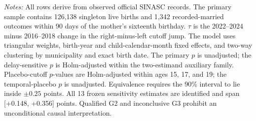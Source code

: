 \begin{table}[!htbp]
\begin{minipage}{0.98\linewidth}
\emph{Notes:} All rows derive from observed official SINASC records. The primary sample contains 126,138 singleton live births and 1,342 recorded-married outcomes within 90 days of the mother's sixteenth birthday. $\tau$ is the 2022--2024 minus 2016--2018 change in the right-minus-left cutoff jump. The model uses triangular weights, birth-year and child-calendar-month fixed effects, and two-way clustering by municipality and exact birth date. The primary $p$ is unadjusted; the delay-sensitive $p$ is Holm-adjusted within the two-estimand auxiliary family. Placebo-cutoff $p$-values are Holm-adjusted within ages 15, 17, and 19; the temporal-placebo $p$ is unadjusted. Equivalence requires the 90\% interval to lie inside $\pm0.25$ points. All 13 frozen sensitivity estimates are identified and span [+0.148, +0.356] points. Qualified G2 and inconclusive G3 prohibit an unconditional causal interpretation.
\end{minipage}
\endgroup
\end{table}
